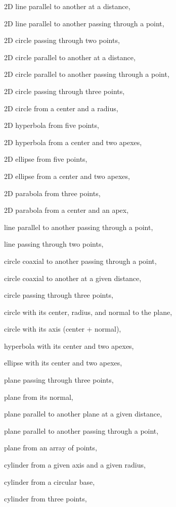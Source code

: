 \begin{DoxyItemize}
\item 2D line parallel to another at a distance,
\item 2D line parallel to another passing through a point,
\item 2D circle passing through two points,
\item 2D circle parallel to another at a distance,
\item 2D circle parallel to another passing through a point,
\item 2D circle passing through three points,
\item 2D circle from a center and a radius,
\item 2D hyperbola from five points,
\item 2D hyperbola from a center and two apexes,
\item 2D ellipse from five points,
\item 2D ellipse from a center and two apexes,
\item 2D parabola from three points,
\item 2D parabola from a center and an apex,
\item line parallel to another passing through a point,
\item line passing through two points,
\item circle coaxial to another passing through a point,
\item circle coaxial to another at a given distance,
\item circle passing through three points,
\item circle with its center, radius, and normal to the plane,
\item circle with its axis (center + normal),
\item hyperbola with its center and two apexes,
\item ellipse with its center and two apexes,
\item plane passing through three points,
\item plane from its normal,
\item plane parallel to another plane at a given distance,
\item plane parallel to another passing through a point,
\item plane from an array of points,
\item cylinder from a given axis and a given radius,
\item cylinder from a circular base,
\item cylinder from three points,

\end{DoxyItemize}
